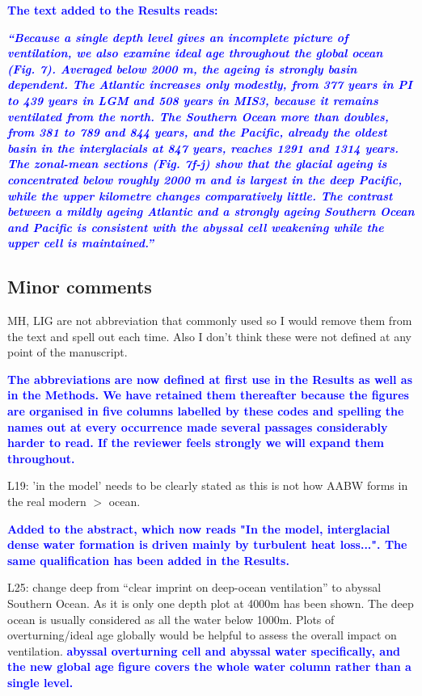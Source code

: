 \documentclass[pdflatex,sn-nature]{sn-jnl}
\begin{document}
\noindent\textcolor{blue}{\textbf{The text added to the Results reads:}}


\medskip
\noindent\textcolor{blue}{\textbf{\textit{``Because a single depth level gives an incomplete picture of ventilation, we also examine ideal age throughout the global ocean (Fig. 7). Averaged below 2000 m, the ageing is strongly basin dependent. The Atlantic increases only modestly, from 377 years in PI to 439 years in LGM and 508 years in MIS3, because it remains ventilated from the north. The Southern Ocean more than doubles, from 381 to 789 and 844 years, and the Pacific, already the oldest basin in the interglacials at 847 years, reaches 1291 and 1314 years. The zonal-mean sections (Fig. 7f-j) show that the glacial ageing is concentrated below roughly 2000 m and is largest in the deep Pacific, while the upper kilometre changes comparatively little. The contrast between a mildly ageing Atlantic and a strongly ageing Southern Ocean and Pacific is consistent with the abyssal cell weakening while the upper cell is maintained.''}}}
\medskip

\subsection*{Minor comments}

\medskip
\noindent MH, LIG are not abbreviation that commonly used so I would remove them from the text and spell out each time. Also I don't think these were not defined at any point of the manuscript.
\medskip

\noindent\textcolor{blue}{\textbf{The abbreviations are now defined at first use in the Results as well as in the Methods. We have retained them thereafter because the figures are organised in five columns labelled by these codes and spelling the names out at every occurrence made several passages considerably harder to read. If the reviewer feels strongly we will expand them throughout.}}


\medskip
\noindent L19: 'in the model' needs to be clearly stated as this is not how AABW forms in the real modern $>$ ocean.
\medskip

\noindent\textcolor{blue}{\textbf{Added to the abstract, which now reads "In the model, interglacial dense water formation is driven mainly by turbulent heat loss...". The same qualification has been added in the Results.}}


\medskip
\noindent L25: change deep from ``clear imprint on deep-ocean ventilation'' to abyssal Southern Ocean. As it is only one depth plot at 4000m has been shown. The deep ocean is usually considered as all the water below 1000m. Plots of overturning/ideal age globally would be helpful to assess the overall impact on ventilation.
\medskip
\noindent\textcolor{blue}{\textbf{abyssal overturning cell and abyssal water specifically, and the new global age figure covers the whole water column rather than a single level.}}
\end{document}
